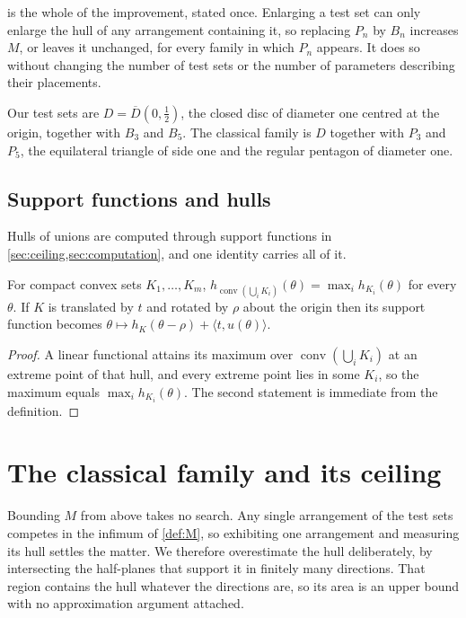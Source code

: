 \documentclass[a4paper,UKenglish,cleveref,autoref,thm-restate,numberwithinsect]{lipics-v2021}
\begin{document}
 is the whole of the improvement, stated once. Enlarging a
test set can only enlarge the hull of any arrangement containing it, so replacing
$P_n$ by $B_n$ increases $M$, or leaves it unchanged, for every family in which
$P_n$ appears. It does so without changing the number of test sets or the number
of parameters describing their placements.

\begin{definition}
\label{def:family}
Our test sets are $D=\overline{D}(0,\tfrac12)$, the closed disc of diameter one
centred at the origin, together with $B_3$ and $B_5$. The classical family is $D$ together with $P_3$ and $P_5$, the equilateral
triangle of side one and the regular pentagon of diameter one.
\end{definition}

\subsection{Support functions and hulls}

Hulls of unions are computed through support functions in
\cref{sec:ceiling,sec:computation}, and one identity carries all of it.

\begin{lemma}
\label{lem:support}
For compact convex sets $K_1,\dots,K_m$,
$h_{\operatorname{conv}(\bigcup_i K_i)}(\theta)=\max_i h_{K_i}(\theta)$ for every
$\theta$. If $K$ is translated by $t$ and rotated by $\rho$ about the origin then
its support function becomes $\theta\mapsto h_K(\theta-\rho)+\langle
t,u(\theta)\rangle$.
\end{lemma}

\begin{proof}
A linear functional attains its maximum over $\operatorname{conv}(\bigcup_i K_i)$
at an extreme point of that hull, and every extreme point lies in some $K_i$, so
the maximum equals $\max_i h_{K_i}(\theta)$. The second statement is immediate
from the definition.
\end{proof}

\section{The classical family and its ceiling}
\label{sec:ceiling}

Bounding $M$ from above takes no search. Any single arrangement of the test sets
competes in the infimum of \cref{def:M}, so exhibiting one arrangement and
measuring its hull settles the matter. We therefore overestimate the hull
deliberately, by intersecting the half-planes that support
it in finitely many directions. That region contains the hull whatever the
directions are, so its area is an upper bound with no approximation argument
attached.
\end{document}
